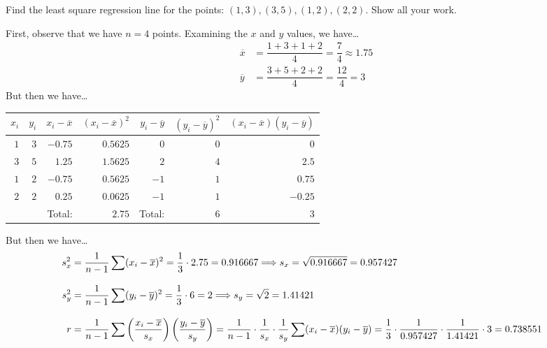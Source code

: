\documentclass[11pt,letterpaper]{article}
\begin{document}
\newpage



 Find the least square regression line for the points: $(1, 3), (3, 5), (1, 2), (2, 2)$. Show all your work. \pspace

\sol First, observe that we have $n= 4$ points. Examining the $x$ and $y$ values, we have\dots
	\[
	\begin{aligned}
	\overline{x}&= \dfrac{1 + 3 + 1 + 2}{4}= \dfrac{7}{4} \approx 1.75 \\[0.3cm]
	\overline{y}&= \dfrac{3 + 5 + 2 + 2}{4}= \dfrac{12}{4}= 3
	\end{aligned}
	\]
But then we have\dots \par
	\begin{table}[!ht]
	\centering
	\begin{tabular}{rrrrrrr}
	\multicolumn{1}{r|}{$x_i$} & \multicolumn{1}{|r|}{$y_i$} & \multicolumn{1}{|r|}{$x_i - \overline{x}$} & \multicolumn{1}{|r|}{$(x_i - \overline{x})^2$} & \multicolumn{1}{|r|}{$y_i - \overline{y}$} & \multicolumn{1}{|r|}{$(y_i - \overline{y})^2$} & \multicolumn{1}{|r}{$(x_i - \overline{x})(y_i - \overline{y})$} \\ \hline
	\multicolumn{1}{r|}{$1$} & \multicolumn{1}{|r|}{$3$} & \multicolumn{1}{|r|}{$-0.75$} & \multicolumn{1}{|r|}{$0.5625$} & \multicolumn{1}{|r|}{$0$} & \multicolumn{1}{|r|}{$0$} & \multicolumn{1}{|r}{$0$} \\ 
	\multicolumn{1}{r|}{$3$} & \multicolumn{1}{|r|}{$5$} & \multicolumn{1}{|r|}{$1.25$} & \multicolumn{1}{|r|}{$1.5625$} & \multicolumn{1}{|r|}{$2$} & \multicolumn{1}{|r|}{$4$} & \multicolumn{1}{|r}{$2.5$} \\
	\multicolumn{1}{r|}{$1$} & \multicolumn{1}{|r|}{$2$} & \multicolumn{1}{|r|}{$-0.75$} & \multicolumn{1}{|r|}{$0.5625$} & \multicolumn{1}{|r|}{$-1$} & \multicolumn{1}{|r|}{$1$} & \multicolumn{1}{|r}{$0.75$} \\ 
	\multicolumn{1}{r|}{$2$} & \multicolumn{1}{|r|}{$2$} & \multicolumn{1}{|r|}{$0.25$} & \multicolumn{1}{|r|}{$0.0625$} & \multicolumn{1}{|r|}{$-1$} & \multicolumn{1}{|r|}{$1$} & \multicolumn{1}{|r}{$-0.25$} \\ \hline
	& & Total: & $2.75$ & Total: & $6$ & $3$
	\end{tabular}
	\end{table}
But then we have\dots
	\[
	\begin{aligned}
	\hspace{-0.3cm} s_x^2&= \dfrac{1}{n - 1} \sum (x_i - \overline{x})^2= \dfrac{1}{3} \cdot 2.75= 0.916667 \Longrightarrow s_x= \sqrt{0.916667}= 0.957427 \\[0.3cm]
	\hspace{-0.3cm} s_y^2&= \dfrac{1}{n - 1} \sum (y_i - \overline{y})^2= \dfrac{1}{3} \cdot 6= 2 \Longrightarrow s_y= \sqrt{2}= 1.41421 \\[0.3cm]
	\hspace{-0.3cm} r&= \dfrac{1}{n - 1} \sum \left( \dfrac{x_i - \overline{x}}{s_x} \right) \left( \dfrac{y_i - \overline{y}}{s_y} \right)= \dfrac{1}{n - 1} \cdot \dfrac{1}{s_x} \cdot \dfrac{1}{s_y} \sum (x_i - \overline{x})(y_i - \overline{y})= \dfrac{1}{3} \cdot \dfrac{1}{0.957427} \cdot \dfrac{1}{1.41421} \cdot 3= 0.738551
	\end{aligned}
	\]
\end{document}
